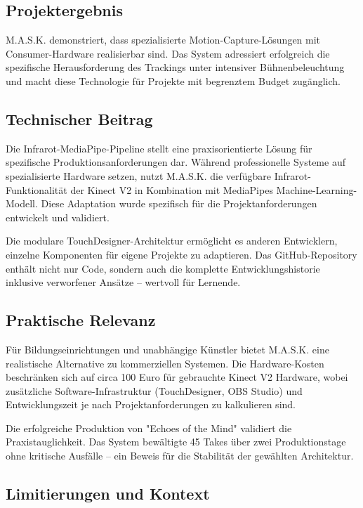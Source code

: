 \subsection{Projektergebnis}

M.A.S.K. demonstriert, dass spezialisierte Motion-Capture-Lösungen mit Consumer-Hardware realisierbar sind. Das System adressiert erfolgreich die spezifische Herausforderung des Trackings unter intensiver Bühnenbeleuchtung und macht diese Technologie für Projekte mit begrenztem Budget zugänglich.

\subsection{Technischer Beitrag}

Die Infrarot-MediaPipe-Pipeline stellt eine praxisorientierte Lösung für spezifische Produktionsanforderungen dar. Während professionelle Systeme auf spezialisierte Hardware setzen, nutzt M.A.S.K. die verfügbare Infrarot-Funktionalität der Kinect V2 in Kombination mit MediaPipes Machine-Learning-Modell. Diese Adaptation wurde spezifisch für die Projektanforderungen entwickelt und validiert.

Die modulare TouchDesigner-Architektur ermöglicht es anderen Entwicklern, einzelne Komponenten für eigene Projekte zu adaptieren. Das GitHub-Repository enthält nicht nur Code, sondern auch die komplette Entwicklungshistorie inklusive verworfener Ansätze – wertvoll für Lernende.

\subsection{Praktische Relevanz}

Für Bildungseinrichtungen und unabhängige Künstler bietet M.A.S.K. eine realistische Alternative zu kommerziellen Systemen. Die Hardware-Kosten beschränken sich auf circa 100 Euro für gebrauchte Kinect V2 Hardware, wobei zusätzliche Software-Infrastruktur (TouchDesigner, OBS Studio) und Entwicklungszeit je nach Projektanforderungen zu kalkulieren sind.

Die erfolgreiche Produktion von "Echoes of the Mind" validiert die Praxistauglichkeit. Das System bewältigte 45 Takes über zwei Produktionstage ohne kritische Ausfälle – ein Beweis für die Stabilität der gewählten Architektur.

\subsection{Limitierungen und Kontext}


